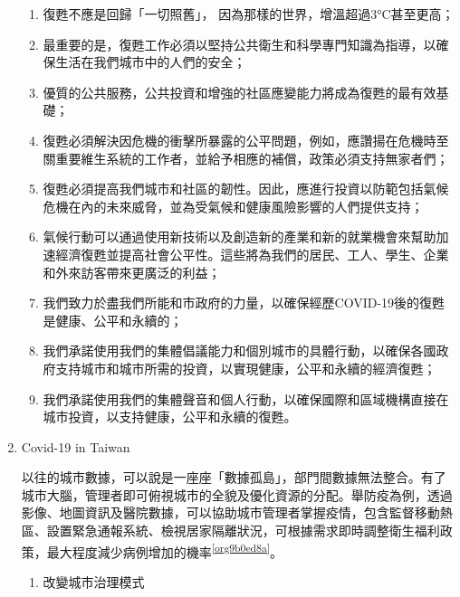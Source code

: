 \documentclass[a4paper,12pt]{article}
\begin{document}
\begin{enumerate}
\begin{enumerate}
\item 復甦不應是回歸「一切照舊」， 因為那樣的世界，增溫超過3°C甚至更高；\\
\item 最重要的是，復甦工作必須以堅持公共衛生和科學專門知識為指導，以確保生活在我們城市中的人們的安全；\\
\item 優質的公共服務，公共投資和增強的社區應變能力將成為復甦的最有效基礎；\\
\item 復甦必須解決因危機的衝擊所暴露的公平問題，例如，應讚揚在危機時至關重要維生系統的工作者，並給予相應的補償，政策必須支持無家者們；\\
\item 復甦必須提高我們城市和社區的韌性。因此，應進行投資以防範包括氣候危機在內的未來威脅，並為受氣候和健康風險影響的人們提供支持；\\
\item 氣候行動可以通過使用新技術以及創造新的產業和新的就業機會來幫助加速經濟復甦並提高社會公平性。這些將為我們的居民、工人、學生、企業和外來訪客帶來更廣泛的利益；\\
\item 我們致力於盡我們所能和市政府的力量，以確保經歷COVID-19後的復甦是健康、公平和永續的；\\
\item 我們承諾使用我們的集體倡議能力和個別城市的具體行動，以確保各國政府支持城市和城市所需的投資，以實現健康，公平和永續的經濟復甦；\\
\item 我們承諾使用我們的集體聲音和個人行動，以確保國際和區域機構直接在城市投資，以支持健康，公平和永續的復甦。\\
\end{enumerate}

\item Covid-19 in Taiwan
\label{sec:org0085144}

以往的城市數據，可以說是一座座「數據孤島」，部門間數據無法整合。有了城市大腦，管理者即可俯視城市的全貌及優化資源的分配。舉防疫為例，透過影像、地圖資訊及醫院數據，可以協助城市管理者掌握疫情，包含監督移動熱區、設置緊急通報系統、檢視居家隔離狀況，可根據需求即時調整衛生福利政策，最大程度減少病例增加的機率\textsuperscript{\ref{org9b0ed8a}}。\\
\begin{enumerate}
\item 改變城市治理模式
\label{sec:org75c3e12}


\end{enumerate}
\end{enumerate}
\end{document}
